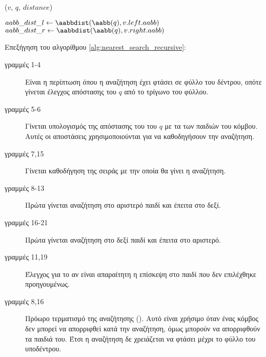 \IncMargin{1.5em}
\begin{algorithm}[h]
    \caption[Αναδρομικός Υπολογισμός Απόστασης Κοντινότερου Γείτονα]{
    }
    \label{alg:nearest_search_recursive}
    \DontPrintSemicolon
    \Indm\nonl\nearestsearchrecur($v$, $q$, $distance$)\\
    \Indp

        $aabb\_dist\_l \gets \aabbdist(\aabb(q), v.left.aabb)$\;
        $aabb\_dist\_r \gets \aabbdist(\aabb(q), v.right.aabb)$\;
        \Return{}

\end{algorithm}
\DecMargin{1.5em}

Επεξήγηση του αλγορίθμου \ref{alg:nearest_search_recursive}:
\begin{description}
    \item[γραμμές 1-4] Είναι η περίπτωση όπου η αναζήτηση έχει 
    φτάσει σε φύλλο του δέντρου, οπότε γίνεται έλεγχος απόστασης 
    του $q$ από το τρίγωνο του φύλλου.
    \item[γραμμές 5-6] Γίνεται υπολογισμός της απόστασης του 
     του $q$ με τα  των παιδιών του κόμβου. 
    Αυτές οι αποστάσεις χρησιμοποιούνται για να καθοδηγήσουν 
    την αναζήτηση.
    \item[γραμμές 7,15] Γίνεται καθοδήγηση της σειράς με την 
    οποία θα γίνει η αναζήτηση.
    \item[γραμμές 8-13] Πρώτα γίνεται αναζήτηση στο αριστερό 
    παιδί και έπειτα στο δεξί.
    \item[γραμμές 16-21] Πρώτα γίνεται αναζήτηση στο δεξί 
    παιδί και έπειτα στο αριστερό.
    \item[γραμμές 11,19] Έλεγχος για το αν είναι απαραίτητη 
    η επίσκεψη στο παιδί που δεν επιλέχθηκε προηγουμένως.
    \item[γραμμές 8,16] Πρόωρο τερματισμό της 
    αναζήτησης (). 
    Αυτό είναι χρήσιμο όταν ένας κόμβος δεν μπορεί να 
    απορριφθεί κατά την αναζήτηση, όμως μπορούν να 
    απορριφθούν τα παιδιά του.
    Έτσι η αναζήτηση δε χρειάζεται να φτάσει μέχρι 
    το φύλλο του υποδέντρου.
\end{description}

